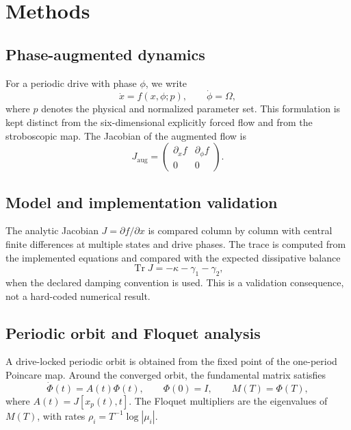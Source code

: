 \documentclass[aip,cha,reprint]{revtex4-2}
\newcommand{\Tr}{\operatorname{Tr}}
\begin{document}
\section{Methods}

\subsection{Phase-augmented dynamics}

For a periodic drive with phase $\phi$, we write
\begin{equation}
\dot{x}=f(x,\phi;p),\qquad \dot\phi=\Omega,
\label{eq:augmented}
\end{equation}
where $p$ denotes the physical and normalized parameter set. This formulation is
kept distinct from the six-dimensional explicitly forced flow and from the
stroboscopic map. The Jacobian of the augmented flow is
\begin{equation}
J_{\mathrm{aug}}=
\begin{pmatrix}
\partial_x f & \partial_\phi f\\
0 & 0
\end{pmatrix}.
\end{equation}

\subsection{Model and implementation validation}

The analytic Jacobian $J=\partial f/\partial x$ is compared column by column with
central finite differences at multiple states and drive phases. The trace is
computed from the implemented equations and compared with the expected dissipative
balance
\begin{equation}
\Tr J=-\kappa-\gamma_1-\gamma_2,
\label{eq:trace}
\end{equation}
when the declared damping convention is used. This is a validation consequence,
not a hard-coded numerical result.

\subsection{Periodic orbit and Floquet analysis}

A drive-locked periodic orbit is obtained from the fixed point of the one-period
Poincare map. Around the converged orbit, the fundamental matrix satisfies
\begin{equation}
\dot\Phi(t)=A(t)\Phi(t),\qquad \Phi(0)=I,\qquad M(T)=\Phi(T),
\label{eq:monodromy}
\end{equation}
where $A(t)=J[x_p(t),t]$. The Floquet multipliers are the eigenvalues of $M(T)$,
with rates $\rho_i=T^{-1}\log|\mu_i|$.
\end{document}
